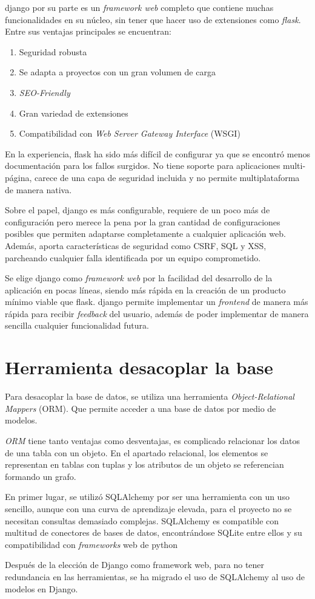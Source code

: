 \Gls{django} por su parte es un \emph{framework web} completo que contiene muchas funcionalidades en su núcleo, sin tener que hacer uso de extensiones como \emph{flask}. Entre sus ventajas principales se encuentran:
\begin{enumerate}
    \item Seguridad robusta
    \item Se adapta a proyectos con un gran volumen de carga
    \item \emph{SEO-Friendly}
    \item Gran variedad de extensiones
    \item Compatibilidad con \emph{Web Server Gateway Interface} (WSGI)
\end{enumerate}

En la experiencia, \Gls{flask} ha sido más difícil de configurar ya que se encontró menos documentación para los fallos surgidos. No tiene soporte para aplicaciones multi-página, carece de una capa de seguridad incluida y no permite multiplataforma de manera nativa.

Sobre el papel, \Gls{django} es más configurable, requiere de un poco más de configuración pero merece la pena por la gran cantidad de configuraciones posibles que permiten adaptarse completamente a cualquier aplicación web. Además, aporta características de seguridad como \gls{CSRF}, \gls{SQL} y \gls{XSS}, parcheando cualquier falla identificada por un equipo comprometido. \cite{frameworkionos2023}\cite{frameworkkinsta2023}

Se elige \Gls{django} como \emph{framework web} por la facilidad del desarrollo de la aplicación en pocas líneas, siendo más rápida en la creación de un producto mínimo viable que \Gls{flask}. \Gls{django} permite implementar un \emph{frontend} de manera más rápida para recibir \emph{feedback} del usuario, además de poder implementar de manera sencilla cualquier funcionalidad futura.

\section{Herramienta desacoplar la \gls{base}}
Para desacoplar la base de datos, se utiliza una herramienta \emph{Object-Relational Mappers} (ORM). Que permite acceder a una base de datos por medio de modelos. 

\emph{ORM} tiene tanto ventajas como desventajas, es complicado relacionar los datos de una tabla con un objeto. En el apartado relacional, los elementos se representan en tablas con tuplas y los atributos de un objeto se referencian formando un grafo. 

En primer lugar, se utilizó SQLAlchemy por ser una herramienta con un uso sencillo, aunque con una curva de aprendizaje elevada, para el proyecto no se necesitan consultas demasiado complejas. SQLAlchemy es compatible con multitud de conectores de bases de datos, encontrándose SQLite entre ellos y su compatibilidad con \emph{frameworks} web de \gls{python} \cite{orm2023}

Después de la elección de Django como framework web, para no tener redundancia en las herramientas, se ha migrado el uso de SQLAlchemy al uso de modelos en Django. 
